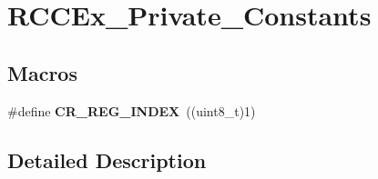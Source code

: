 \hypertarget{group___r_c_c_ex___private___constants}{}\section{R\+C\+C\+Ex\+\_\+\+Private\+\_\+\+Constants}
\label{group___r_c_c_ex___private___constants}
\subsection*{Macros}
\begin{DoxyCompactItemize}
\item 
\mbox{\label{group___r_c_c_ex___private___constants_ga56feb1abcd35b22427fa55164c585afa}} 
\#define {\bfseries C\+R\+\_\+\+R\+E\+G\+\_\+\+I\+N\+D\+EX}~((uint8\+\_\+t)1)
\end{DoxyCompactItemize}


\subsection{Detailed Description}
